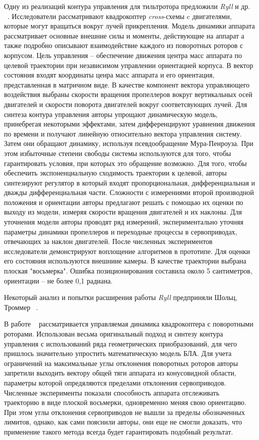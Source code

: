 Одну из реализаций контура управления для тильтротора предложили \textit{Ryll} и др. ~\cite{Ryll01}. Исследователи рассматривают квадрокоптер \textit{cross}-схемы c двигателями, которые могут вращаться вокруг лучей прикрепления. Модель динамики аппарата рассматривает основные внешние силы и моменты, действующие на аппарат а также подробно описывают взаимодействие каждого из поворотных роторов с корпусом. Цель управления -- обеспечение движения центра масс аппарата по целевой траектории при независимом управлении ориентацией корпуса. В вектор состояния входят координаты ценра масс аппарата и его ориентация, представленная в матричном виде. В качестве компонент вектора управляющего воздействия выбраны скорости вращения пропеллеров вокруг вертикальных осей двигателей и скорости поворота двигателей вокруг соответсвующих лучей. Для синтеза контура управления авторы упрощают динамическую модель, принебрегая некоторыми эффектами, затем дифференцируют уравнения движения по времени и получают линейную относительно вектора управления систему. Затем они обращают динамику, используя псевдообращение Мура-Пенроуза. При этом избыточные степени свободы системы используются для того, чтобы гарантировать условия, при которых это обращение возможно. Для того, чтобы обеспечить экспоненциальную сходимость траектории к целевой, авторы синтезируют регулятор в который входят пропорциональная, дифференциальная и дважды дифференциальная части. Сложности с измерениями второй производной положения и ориентации авторы предлагают решать с помощью их оценки по выходу из модели, измеряя скорости вращения двигателей и их наклоны. Для уточнения модели авторы проводят ряд измерений, экспериментально уточняя параметры динамики пропеллеров и переходные процессы в сервоприводах, отвечающих за наклон двигателей. После численных экспериментов исследователи демонстрируют воплощение алгоритмов в прототипе. Для оценки его состояния используются внешниие камеры. В качестве траектории выбрана плоская "восьмерка". Ошибка позиционирования составила около 5 сантиметров, ориентации -- не более 0,1 радиана.

Некоторый анализ и попытки расширения работы \textit{Ryll} предприняли Шольц, Троммер ~\cite{Stolc01}.

В работе  ~\cite{Invernizzi01} рассматривается управляемая динамика квадрокоптера с поворотными роторами. Использован весьма оригинальный подход  и синтезу контура управления с использований ряда геометрических приобразований, для чего пришлось значительно упростить математическую модель БЛА. Для учета ограничений на максимальные углы отклонения поворотных роторов авторы запретили выходить вектору общей тяги аппарата из конусовидной области, параметры которой опредяляются пределами отклонения сервоприводов. Численные эксперименты показали способность аппарата отслеживать траекторию в виде плоской восьмерки, одновременно меняя свою ориентацию. При этом углы отклонения сервоприводов не вышли за пределы обозначенных лимитов, однако, как сами пояснили авторы, они еще не смогли доказать, что применение такого метода всегда будет гарантировать подобный результат.

